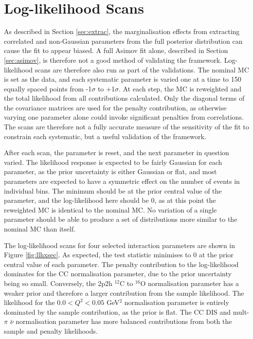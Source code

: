 \section{Log-likelihood Scans}\label{sec:llhscan}

As described in Section \ref{sec:extrac}, the marginalisation effects from extracting correlated and non-Gaussian parameters from the full posterior distribution can cause the fit to appear biased. A full Asimov fit alone, described in Section \ref{sec:asimov}, is therefore not a good method of validating the framework. Log-likelihood scans are therefore also run as part of the validations. The nominal MC is set as the data, and each systematic parameter is varied one at a time to 150 equally spaced points from -1$\sigma$ to +1$\sigma$. At each step, the MC is reweighted and the total likelihood from all contributions calculated. Only the diagonal terms of the covariance matrices are used for the penalty contribution, as otherwise varying one parameter alone could invoke significant penalties from correlations. The scans are therefore not a fully accurate measure of the sensitivity of the fit to constrain each systematic, but a useful validation of the framework.

After each scan, the parameter is reset, and the next parameter in question varied. The likelihood response is expected to be fairly Gaussian for each parameter, as the prior uncertainty is either Gaussian or flat, and most parameters are expected to have a symmetric effect on the number of events in individual bins. The minimum should be at the prior central value of the parameter, and the log-likelihood here should be 0, as at this point the reweighted MC is identical to the nominal MC. No variation of a single parameter should be able to produce a set of distributions more similar to the nominal MC than itself.

The log-likelihood scans for four selected interaction parameters are shown in Figure \ref{fig:llhxsec}. As expected, the test statistic minimises to 0 at the prior central value of each parameter. The penalty contribution to the log-likelihood dominates for the CC normalisation parameter, due to the prior uncertainty being so small. Conversely, the 2p2h $^{12}$C to $^{16}$O normalisation parameter has a weaker prior and therefore a larger contribution from the sample likelihood. The likelihood for the $0.0 < Q^2 < 0.05$ GeV$^2$ normalisation parameter is entirely dominated by the sample contribution, as the prior is flat. The CC DIS and mult-$\pi$ $\bar{\nu}$ normalisation parameter has more balanced contributions from both the sample and penalty likelihoods.

